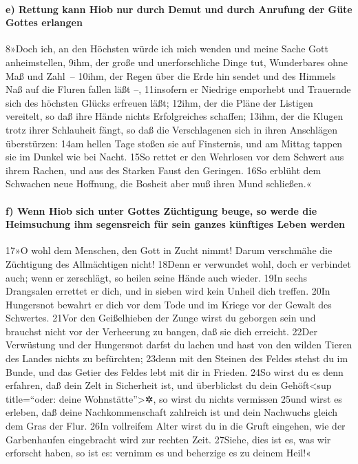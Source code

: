 \hypertarget{e-rettung-kann-hiob-nur-durch-demut-und-durch-anrufung-der-guxfcte-gottes-erlangen}{%
\paragraph{e) Rettung kann Hiob nur durch Demut und durch Anrufung der
Güte Gottes
erlangen}\label{e-rettung-kann-hiob-nur-durch-demut-und-durch-anrufung-der-guxfcte-gottes-erlangen}}

8»Doch ich, an den Höchsten würde ich mich wenden und meine Sache Gott
anheimstellen, 9ihm, der große und unerforschliche Dinge tut,
Wunderbares ohne Maß und Zahl~-- 10ihm, der Regen über die Erde hin
sendet und des Himmels Naß auf die Fluren fallen läßt --, 11insofern er
Niedrige emporhebt und Trauernde sich des höchsten Glücks erfreuen läßt;
12ihm, der die Pläne der Listigen vereitelt, so daß ihre Hände nichts
Erfolgreiches schaffen; 13ihm, der die Klugen trotz ihrer Schlauheit
fängt, so daß die Verschlagenen sich in ihren Anschlägen überstürzen:
14am hellen Tage stoßen sie auf Finsternis, und am Mittag tappen sie im
Dunkel wie bei Nacht. 15So rettet er den Wehrlosen vor dem Schwert aus
ihrem Rachen, und aus des Starken Faust den Geringen. 16So erblüht dem
Schwachen neue Hoffnung, die Bosheit aber muß ihren Mund schließen.«

\hypertarget{f-wenn-hiob-sich-unter-gottes-zuxfcchtigung-beuge-so-werde-die-heimsuchung-ihm-segensreich-fuxfcr-sein-ganzes-kuxfcnftiges-leben-werden}{%
\paragraph{f) Wenn Hiob sich unter Gottes Züchtigung beuge, so werde die
Heimsuchung ihm segensreich für sein ganzes künftiges Leben
werden}\label{f-wenn-hiob-sich-unter-gottes-zuxfcchtigung-beuge-so-werde-die-heimsuchung-ihm-segensreich-fuxfcr-sein-ganzes-kuxfcnftiges-leben-werden}}

17»O wohl dem Menschen, den Gott in Zucht nimmt! Darum verschmähe die
Züchtigung des Allmächtigen nicht! 18Denn er verwundet wohl, doch er
verbindet auch; wenn er zerschlägt, so heilen seine Hände auch wieder.
19In sechs Drangsalen errettet er dich, und in sieben wird kein Unheil
dich treffen. 20In Hungersnot bewahrt er dich vor dem Tode und im Kriege
vor der Gewalt des Schwertes. 21Vor den Geißelhieben der Zunge wirst du
geborgen sein und brauchst nicht vor der Verheerung zu bangen, daß sie
dich erreicht. 22Der Verwüstung und der Hungersnot darfst du lachen und
hast von den wilden Tieren des Landes nichts zu befürchten; 23denn mit
den Steinen des Feldes stehst du im Bunde, und das Getier des Feldes
lebt mit dir in Frieden. 24So wirst du es denn erfahren, daß dein Zelt
in Sicherheit ist, und überblickst du dein Gehöft\textless sup
title=``oder: deine Wohnstätte''\textgreater✲, so wirst du nichts
vermissen 25und wirst es erleben, daß deine Nachkommenschaft zahlreich
ist und dein Nachwuchs gleich dem Gras der Flur. 26In vollreifem Alter
wirst du in die Gruft eingehen, wie der Garbenhaufen eingebracht wird
zur rechten Zeit. 27Siehe, dies ist es, was wir erforscht haben, so ist
es: vernimm es und beherzige es zu deinem Heil!«

